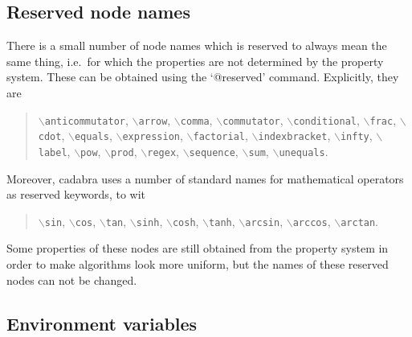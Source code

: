 \documentclass[11pt]{article}
\newcommand{\cdb}{{cadabra}\xspace}
\newenvironment{reserved}{\par\noindent\description}{\enddescription}
\newcommand{\texcommand}[1]{{\tt $\backslash$#1}}
\numberwithin{equation}{section}
\begin{document}
\subsection{Reserved node names}
\label{s:reserved_names}

There is a small number of node names which is reserved to always mean
the same thing, i.e.~for which the properties are not determined by
the property system. These can be obtained using the `@reserved'
command. Explicitly, they are
%
%
\begin{quote}
\texcommand{anticommutator},
\texcommand{arrow},
\texcommand{comma}, 
\texcommand{commutator}, 
\texcommand{conditional},
\texcommand{frac}, 
\texcommand{cdot},
\texcommand{equals}, 
\texcommand{expression},
\texcommand{factorial},
\texcommand{indexbracket}, 
\texcommand{infty}, 
\texcommand{label},
\texcommand{pow}, 
\texcommand{prod}, 
\texcommand{regex}, 
\texcommand{sequence},
\texcommand{sum},
\texcommand{unequals}.
\end{quote}
Moreover, \cdb uses a number of standard names for mathematical
operators as reserved keywords, to wit
\begin{quote}
\texcommand{sin},
\texcommand{cos},
\texcommand{tan},
\texcommand{sinh},
\texcommand{cosh},
\texcommand{tanh},
\texcommand{arcsin},
\texcommand{arccos},
\texcommand{arctan}.
\end{quote}
Some properties of these nodes are still obtained from the property
system in order to make algorithms look more uniform, but the names of
these reserved nodes can not be changed. 

\begin{reserved}



















\end{reserved}


\subsection{Environment variables}
\label{s:environment_variables}
\end{document}

